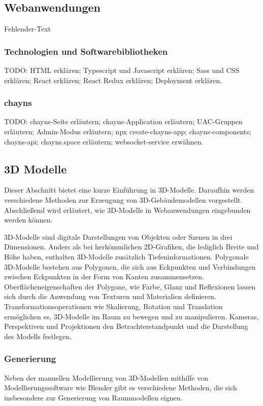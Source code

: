 \subsection{Webanwendungen}
Fehlender-Text

\subsubsection{Technologien und Softwarebibliotheken}\label{sec:WebTechnologies}
TODO: HTML erklären; Typescript und Javascript erklären; \ac{Sass} und CSS erklären; React erklären; React Redux erklären; Deployment erklären.

\subsubsection{chayns}\label{sec:Chayns}
TODO: chayns-Seite erläutern; chayns-Application erläutern; UAC-Gruppen erläutern; Admin-Modus erläutern; npx create-chayns-app; chayns-components; chayns-api; chayns.space erläutern; websocket-service erwähnen.

\subsection{3D Modelle}
Dieser Abschnitt bietet eine kurze Einführung in 3D-Modelle. Daraufhin werden verschiedene Methoden zur Erzeugung von 3D-Gebäudemodellen vorgestellt. Abschließend wird erläutert, wie 3D-Modelle in Webanwendungen eingebunden werden können.

3D-Modelle sind digitale Darstellungen von Objekten oder Szenen in drei Dimensionen. Anders als bei herkömmlichen 2D-Grafiken, die lediglich Breite und Höhe haben, enthalten 3D-Modelle zusätzlich Tiefeninformationen. Polygonale 3D-Modelle bestehen aus Polygonen, die sich aus Eckpunkten und Verbindungen zwischen Eckpunkten in der Form von Kanten zusammensetzen. Oberflächeneigenschaften der Polygone, wie Farbe, Glanz und Reflexionen lassen sich durch die Anwendung von Texturen und Materialien definieren. Transformationsoperationen wie Skalierung, Rotation und Translation ermöglichen es, 3D-Modelle im Raum zu bewegen und zu manipulieren. Kameras, Perspektiven und Projektionen den Betrachterstandpunkt und die Darstellung des Modells festlegen.\cite[S.~8-16]{Parisi2014}

\subsubsection{Generierung}
Neben der manuellen Modellierung von 3D-Modellen mithilfe von Modellierungssoftware wie Blender gibt es verschiedene Methoden, die sich insbesondere zur Generierung von Raummodellen eignen.

